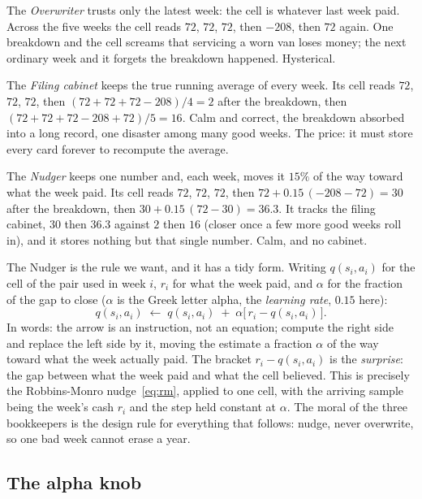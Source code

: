 \documentclass[11pt,a4paper]{article}
\theoremstyle{definition}
\theoremstyle{remark}
\numberwithin{equation}{section}
\begin{document}
The \emph{Overwriter} trusts only the latest week: the cell is whatever last week paid. Across
the five weeks the cell reads $72$, $72$, $72$, then $-208$, then $72$ again. One breakdown and
the cell screams that servicing a worn van loses money; the next ordinary week and it forgets
the breakdown happened. Hysterical.

The \emph{Filing cabinet} keeps the true running average of every week. Its cell reads $72$,
$72$, $72$, then $(72+72+72-208)/4 = 2$ after the breakdown, then $(72+72+72-208+72)/5 = 16$.
Calm and correct, the breakdown absorbed into a long record, one disaster among many good
weeks. The price: it must store every card forever to recompute the average.

The \emph{Nudger} keeps one number and, each week, moves it $15\%$ of the way toward what the
week paid. Its cell reads $72$, $72$, $72$, then $72 + 0.15\,(-208 - 72) = 30$ after the
breakdown, then $30 + 0.15\,(72 - 30) = 36.3$. It tracks the filing cabinet, $30$ then $36.3$
against $2$ then $16$ (closer once a few more good weeks roll in), and it stores nothing but
that single number. Calm, and no cabinet.

The Nudger is the rule we want, and it has a tidy form. Writing $q(s_i, a_i)$ for the cell of
the pair used in week $i$, $r_i$ for what the week paid, and $\alpha$ for the fraction of the
gap to close ($\alpha$ is the Greek letter alpha, the \emph{learning rate}, $0.15$ here):
\begin{equation}\label{eq:cashrule}
q(s_i, a_i) \;\leftarrow\; q(s_i, a_i) \;+\; \alpha \bigl[\, r_i - q(s_i, a_i) \,\bigr].
\end{equation}
In words: the arrow is an instruction, not an equation; compute the right side and replace the
left side by it, moving the estimate a fraction $\alpha$ of the way toward what the week
actually paid. The bracket $r_i - q(s_i, a_i)$ is the \emph{surprise}: the gap between what
the week paid and what the cell believed. This is precisely the Robbins-Monro
nudge~\eqref{eq:rm}, applied to one cell, with the arriving sample being the week's cash $r_i$
and the step held constant at $\alpha$. The moral of the three bookkeepers is the design rule
for everything that follows: nudge, never overwrite, so one bad week cannot erase a year.

\subsection*{The alpha knob}
\end{document}
